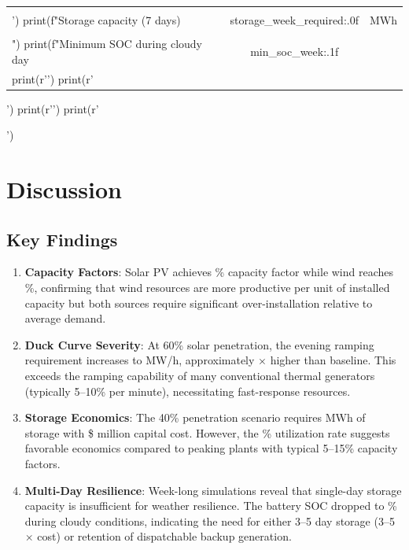 \documentclass[11pt,a4paper]{article}
\begin{document}
\begin{pycode}
\begin{table}[H]
\begin{tabular}{@{}lcc@{}}
{{print(r'\midrule')
print(r'\multicolumn{3}{l}{\textit{Week-Long Simulation}} \\')
print(f"Storage capacity (7 days) & {storage_week_required:.0f} & MWh \\\\")
print(f"Minimum SOC during cloudy day & {min_soc_week:.1f} & \\%
print(r'\bottomrule')
print(r'\end{tabular}')
print(r'\label{tab:results}')
print(r'\end{table}')
\end{pycode}

\section{Discussion}

\subsection{Key Findings}

\begin{enumerate}
\item \textbf{Capacity Factors}: Solar PV achieves \% capacity factor while
wind reaches \%, confirming that wind resources are more productive per unit
of installed capacity but both sources require significant over-installation relative to average
demand.

\item \textbf{Duck Curve Severity}: At 60\% solar penetration, the evening ramping requirement
increases to  MW/h, approximately $\times$
higher than baseline. This exceeds the ramping capability of many conventional thermal generators
(typically 5--10\% per minute), necessitating fast-response resources.

\item \textbf{Storage Economics}: The 40\% penetration scenario requires 
MWh of storage with \$ million capital cost. However, the
\% utilization rate suggests favorable economics
compared to peaking plants with typical 5--15\% capacity factors.

\item \textbf{Multi-Day Resilience}: Week-long simulations reveal that single-day storage capacity
is insufficient for weather resilience. The battery SOC dropped to \%
during cloudy conditions, indicating the need for either 3--5 day storage (3--5$\times$ cost) or
retention of dispatchable backup generation.
\end{enumerate}
\end{document}
